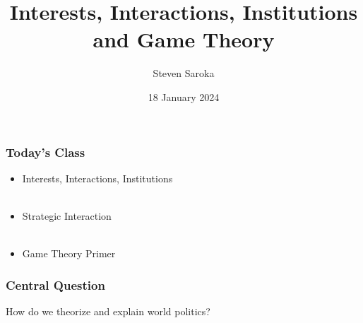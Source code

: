 \documentclass[handout]{beamer}
\title[The Three I's]{\LARGE{Interests, Interactions, Institutions and Game Theory}}
\author[POLI 150]{Steven Saroka}
\institute{POLI 150}
\date{18 January 2024}
\begin{document}
\begin{frame}
\titlepage %
\end{frame}









\begin{frame} 
	\frametitle{\LARGE{Today's Class}}
	\begin{itemize}
			\item Interests, Interactions, Institutions
			\\~\\ 
			\item Strategic Interaction 
			\\~\\
			\item Game Theory Primer
	\end{itemize}
\end{frame}

\begin{frame} 
	\frametitle{\LARGE{Central Question}}
	\begin{center}
	    	\LARGE How do we theorize and explain world politics? 
   	\end{center}
\end{frame}
\end{document}
